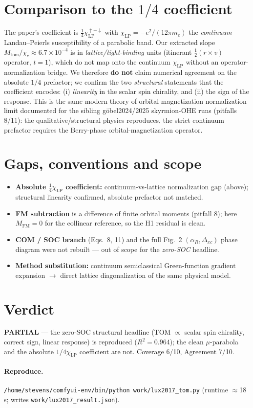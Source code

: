 \documentclass[11pt]{article}
\begin{document}
\section{Comparison to the $1/4$ coefficient}
The paper's coefficient is $\tfrac14\chi_{\mathrm{LP}}^{\uparrow+\downarrow}$ with
$\chi_{\mathrm{LP}}=-e^2/(12\pi m_e)$ the \emph{continuum} Landau--Peierls
susceptibility of a parabolic band. Our extracted slope
$M_{\mathrm{tom}}/\chi_c\approx6.7\times10^{-4}$ is in \emph{lattice/tight-binding}
units (itinerant $\tfrac12(r\times v)$ operator, $t=1$), which do not map onto the
continuum $\chi_{\mathrm{LP}}$ without an operator-normalization bridge. We
therefore \textbf{do not} claim numerical agreement on the absolute $1/4$
prefactor; we confirm the two \emph{structural} statements that the coefficient
encodes: (i) \emph{linearity} in the scalar spin chirality, and (ii) the sign of
the response. This is the same modern-theory-of-orbital-magnetization
normalization limit documented for the sibling g\"obel2024/2025 skyrmion-OHE runs
(pitfalls 8/11): the qualitative/structural physics reproduces, the strict
continuum prefactor requires the Berry-phase orbital-magnetization operator.

\section{Gaps, conventions and scope}
\begin{itemize}
\item \textbf{Absolute $\tfrac14\chi_{\mathrm{LP}}$ coefficient:} continuum-vs-lattice
normalization gap (above); structural linearity confirmed, absolute prefactor not
matched.
\item \textbf{FM subtraction} is a difference of finite orbital moments (pitfall 8);
here $M_{\mathrm{FM}}=0$ for the collinear reference, so the H1 residual is clean.
\item \textbf{COM / SOC branch} (Eqs.~8, 11) and the full Fig.~2 $(\alpha_R,\Delta_{xc})$
phase diagram were not rebuilt --- out of scope for the \emph{zero-SOC} headline.
\item \textbf{Method substitution:} continuum semiclassical Green-function gradient
expansion $\to$ direct lattice diagonalization of the same physical model.
\end{itemize}

\section*{Verdict}
\textbf{PARTIAL} --- the zero-SOC structural headline (TOM $\propto$ scalar spin
chirality, correct sign, linear response) is reproduced ($R^2=0.964$); the clean
$\mu$-parabola and the absolute $1/4\chi_{\mathrm{LP}}$ coefficient are not.
Coverage 6/10, Agreement 7/10.

\paragraph{Reproduce.}
\texttt{/home/stevens/comfyui-env/bin/python work/lux2017\_tom.py}
(runtime $\approx$18\,s; writes \texttt{work/lux2017\_result.json}).
\end{document}
